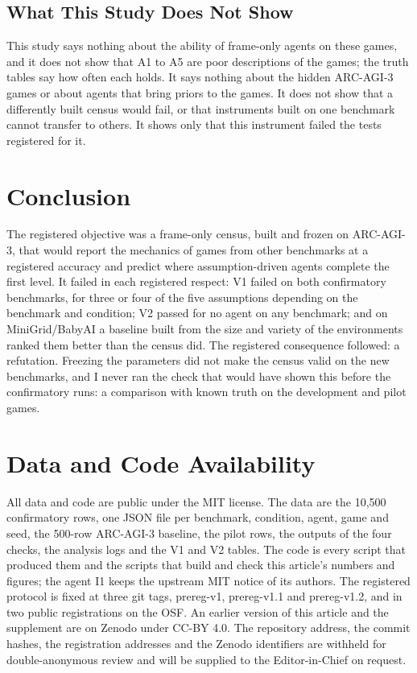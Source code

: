 \documentclass[journal]{IEEEtran}
\begin{document}
\subsection{What This Study Does Not
Show}\label{what-this-study-does-not-show}

This study says nothing about the ability of frame-only agents on these
games, and it does not show that A1 to A5 are poor descriptions of the
games; the truth tables say how often each holds. It says nothing about
the hidden ARC-AGI-3 games or about agents that bring priors to the
games. It does not show that a differently built census would fail, or
that instruments built on one benchmark cannot transfer to others. It
shows only that this instrument failed the tests registered for it.

\section{Conclusion}\label{conclusion}

The registered objective was a frame-only census, built and frozen on
ARC-AGI-3, that would report the mechanics of games from other
benchmarks at a registered accuracy and predict where assumption-driven
agents complete the first level. It failed in each registered respect:
V1 failed on both confirmatory benchmarks, for three or four of the five
assumptions depending on the benchmark and condition; V2 passed for no
agent on any benchmark; and on MiniGrid/BabyAI a baseline built from the
size and variety of the environments ranked them better than the census
did. The registered consequence followed: a refutation. Freezing the
parameters did not make the census valid on the new benchmarks, and I
never ran the check that would have shown this before the confirmatory
runs: a comparison with known truth on the development and pilot games.

\section*{Data and Code Availability}\label{data-and-code-availability}

All data and code are public under the MIT license. The data are the
10,500 confirmatory rows, one JSON file per benchmark, condition, agent,
game and seed, the 500-row ARC-AGI-3 baseline, the pilot rows, the
outputs of the four checks, the analysis logs and the V1 and V2 tables.
The code is every script that produced them and the scripts that build
and check this article's numbers and figures; the agent I1 keeps the
upstream MIT notice of its authors. The registered protocol is fixed at
three git tags, prereg-v1, prereg-v1.1 and prereg-v1.2, and in two
public registrations on the OSF. An earlier version of this article and
the supplement are on Zenodo under CC-BY 4.0. The repository address,
the commit hashes, the registration addresses and the Zenodo identifiers
are withheld for double-anonymous review and will be supplied to the
Editor-in-Chief on request.
\end{document}
